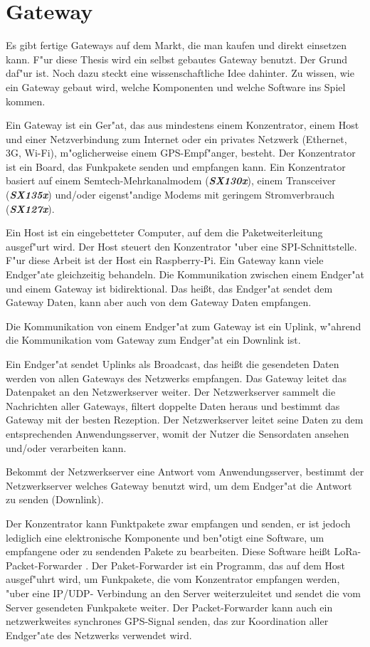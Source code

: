 \section{Gateway}\label{Gateway}

Es gibt fertige Gateways auf dem Markt, die man kaufen und direkt
einsetzen kann. F"ur diese Thesis wird ein selbst gebautes Gateway
benutzt. Der Grund daf"ur ist. Noch dazu steckt eine wissenschaftliche Idee
dahinter. Zu wissen, wie ein Gateway gebaut wird, welche Komponenten
und welche Software ins Spiel kommen.  

Ein Gateway ist ein Ger"at, das aus mindestens einem Konzentrator, einem
Host und einer Netzverbindung zum Internet oder ein privates Netzwerk
(Ethernet, 3G, Wi-Fi), m"oglicherweise einem GPS-Empf"anger, besteht. Der
Konzentrator ist ein Board, das Funkpakete senden und empfangen kann.
Ein Konzentrator basiert auf einem Semtech-Mehrkanalmodem
(\textbf{\textit{SX130x}}), einem Transceiver (\textbf{\textit{SX135x}})
und/oder eigenst"andige Modems mit geringem Stromverbrauch
(\textbf{\textit{SX127x}}).  

Ein Host ist ein eingebetteter Computer, auf dem die Paketweiterleitung
ausgef"urt wird. Der Host steuert den Konzentrator "uber eine
SPI-Schnittstelle. F"ur diese Arbeit ist der Host ein Raspberry-Pi. Ein
Gateway kann viele Endger"ate gleichzeitig behandeln. Die Kommunikation
zwischen einem Endger"at und einem Gateway ist bidirektional. Das hei\ss{}t,
das Endger"at sendet dem Gateway Daten, kann aber auch von dem
Gateway Daten empfangen.

Die Kommunikation von einem Endger"at zum Gateway ist ein Uplink,
w"ahrend die Kommunikation vom Gateway zum Endger"at ein Downlink ist.


Ein Endger"at sendet Uplinks als Broadcast, das hei\ss{}t die gesendeten
Daten werden von allen Gateways des Netzwerks empfangen. Das Gateway
leitet das Datenpaket an den Netzwerkserver weiter. Der Netzwerkserver
sammelt die Nachrichten aller Gateways, filtert doppelte Daten heraus
und bestimmt das Gateway mit der besten Rezeption. Der Netzwerkserver
leitet seine Daten zu dem entsprechenden Anwendungsserver, womit der
Nutzer die Sensordaten ansehen und/oder verarbeiten kann.

Bekommt der Netzwerkserver eine Antwort vom Anwendungsserver,
bestimmt der Netzwerkserver welches Gateway benutzt wird, um dem Endger"at
die Antwort zu senden (Downlink).

Der Konzentrator kann Funktpakete zwar empfangen und senden, er ist
jedoch lediglich eine elektronische Komponente und ben"otigt eine
Software, um empfangene oder zu sendenden Pakete zu bearbeiten. Diese 
Software hei\ss{}t LoRa-Packet-Forwarder \cite{paketForwarder}. 
Der Paket-Forwarder ist ein Programm, das auf dem Host ausgef"uhrt wird,
um Funkpakete, die vom Konzentrator empfangen werden, "uber eine IP/UDP-
Verbindung an den Server weiterzuleitet und sendet die vom Server gesendeten 
Funkpakete weiter. Der Packet-Forwarder kann auch ein netzwerkweites
synchrones GPS-Signal senden, das zur Koordination aller Endger"ate des
Netzwerks verwendet wird. 


